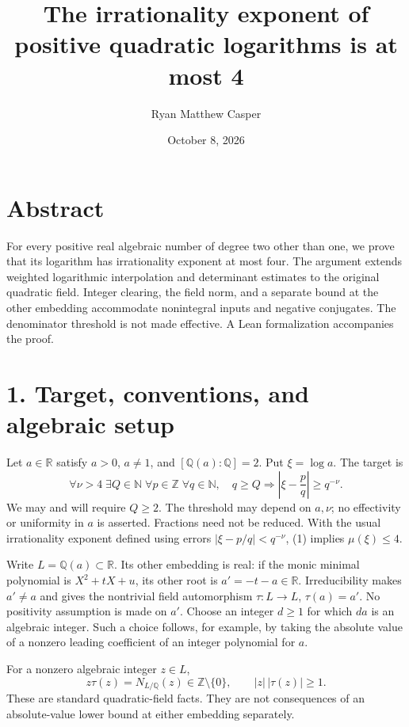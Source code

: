 \documentclass[11pt]{article}
\title{The irrationality exponent of\\positive quadratic logarithms is at most 4}
\author{Ryan Matthew Casper}
\date{October 8, 2026}
\begin{document}
\maketitle
\section{Abstract}\label{abstract}

For every positive real algebraic number of degree two other than one,
we prove that its logarithm has irrationality exponent at most four. The
argument extends weighted logarithmic interpolation and determinant
estimates to the original quadratic field. Integer clearing, the field
norm, and a separate bound at the other embedding accommodate
nonintegral inputs and negative conjugates. The denominator threshold is
not made effective. A Lean formalization accompanies the proof.

\section{1. Target, conventions, and algebraic
setup}\label{target-conventions-and-algebraic-setup}

Let \(a\in\mathbb R\) satisfy \(a>0\), \(a\ne1\), and
\([\mathbb Q(a):\mathbb Q]=2\). Put \(\xi=\log a\). The target is \[
\forall\nu>4\;\exists Q\in\mathbb N\;\forall p\in\mathbb Z\;\forall q\in\mathbb N,
\quad q\ge Q\Longrightarrow
\left|\xi-\frac pq\right|\ge q^{-\nu}.                 \tag{1}
\] We may and will require \(Q\ge2\). The threshold may depend on
\(a,\nu\); no effectivity or uniformity in \(a\) is asserted. Fractions
need not be reduced. With the usual irrationality exponent defined using
errors \(|\xi-p/q|<q^{-\nu}\), (1) implies \(\mu(\xi)\le4\).

Write \(L=\mathbb Q(a)\subset\mathbb R\). Its other embedding is real:
if the monic minimal polynomial is \(X^2+tX+u\), its other root is
\(a'=-t-a\in\mathbb R\). Irreducibility makes \(a'\ne a\) and gives the
nontrivial field automorphism \(\tau:L\to L\), \(\tau(a)=a'\). No
positivity assumption is made on \(a'\). Choose an integer \(d\ge1\) for
which \(da\) is an algebraic integer. Such a choice follows, for
example, by taking the absolute value of a nonzero leading coefficient
of an integer polynomial for \(a\).

For a nonzero algebraic integer \(z\in L\), \[
z\tau(z)=N_{L/\mathbb Q}(z)\in\mathbb Z\setminus\{0\},
\qquad |z|\,|\tau(z)|\ge1.                           \tag{2}
\] These are standard quadratic-field facts. They are not consequences
of an absolute-value lower bound at either embedding separately.
\end{document}
